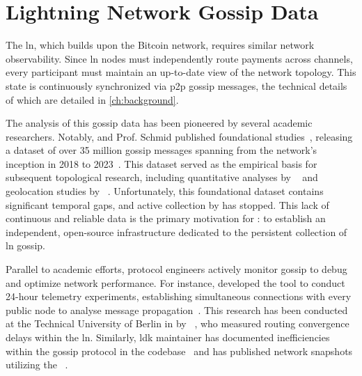 \section{Lightning Network Gossip Data}

The \gls{ln}, which builds upon the Bitcoin network, requires similar network observability. 
Since \gls{ln} nodes must independently route payments across channels, 
every participant must maintain an up-to-date view of the network topology. 
This state is continuously synchronized via \gls{p2p} gossip messages, 
the technical details of which are detailed in \autoref{ch:background}.

The analysis of this gossip data has been pioneered by several academic researchers. 
Notably, \citeauthor{decker_lnresearch_2020} and Prof. Schmid
published foundational studies~\cite{zabka_empirical_2022, zabka_short_2022}, 
releasing a dataset of over \num{35} million gossip messages spanning 
from the network's inception in 2018 to 2023~\cite{decker_lnresearch_2020}. 
This dataset served as the empirical basis for subsequent topological research, 
including quantitative analyses by \citeauthor{atmanaviciute_quantitative_2025}~\cite{atmanaviciute_quantitative_2025} 
and geolocation studies by \citeauthor{valko_geolocated_2025}~\cite{valko_geolocated_2025}. 
Unfortunately, this foundational dataset contains significant temporal gaps, 
and active collection by \citeauthor{decker_lnresearch_2020} has stopped. 
This lack of continuous and reliable data is the primary motivation 
for : to establish an independent, open-source infrastructure dedicated 
to the persistent collection of \gls{ln} gossip. 

Parallel to academic efforts, protocol engineers actively monitor gossip 
to debug and optimize network performance. 
For instance, \citeauthor{harvey-buschel_jharveyb_2026} developed the  tool
to conduct 24-hour telemetry experiments, establishing simultaneous connections
with every public node to analyse message propagation~\cite{harvey-buschel_gossip_2025}. 
This research has been conducted at the Technical University of Berlin in 
\citeyear{gogge_routing_2022} by \citeauthor{gogge_routing_2022}~\cite{gogge_routing_2022},
who measured routing convergence delays within the \gls{ln}.
Similarly, \gls{ldk} maintainer \citeauthor{mattcorallo_bluematts_2026} 
has documented inefficiencies within the gossip protocol in the codebase~\cite{lightningdevkit_rustlightning_2025} 
and has published network snapshots utilizing the ~\cite{corallo_lightningdevkit_2025}.

